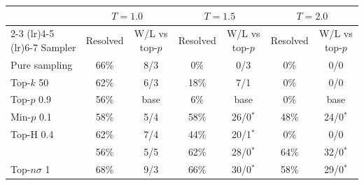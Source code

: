 \begin{tabular}{lcccccc}
\toprule
 & \multicolumn{2}{c}{$T{=}1.0$} & \multicolumn{2}{c}{$T{=}1.5$} & \multicolumn{2}{c}{$T{=}2.0$} \\
\cmidrule(lr){2-3} \cmidrule(lr){4-5} \cmidrule(lr){6-7}
Sampler & Resolved & W/L vs top-$p$ & Resolved & W/L vs top-$p$ & Resolved & W/L vs top-$p$ \\
\midrule
Pure sampling & 66\% & 8/3 & 0\% & 0/3 & 0\% & 0/0 \\
Top-$k$ 50 & 62\% & 6/3 & 18\% & 7/1 & 0\% & 0/0 \\
Top-$p$ 0.9 & 56\% & base & 6\% & base & 0\% & base \\
Min-$p$ 0.1 & 58\% & 5/4 & 58\% & 26/0$^{*}$ & 48\% & 24/0$^{*}$ \\
Top-H 0.4 & 62\% & 7/4 & 44\% & 20/1$^{*}$ & 0\% & 0/0 \\
\pless{} & 56\% & 5/5 & 62\% & 28/0$^{*}$ & 64\% & 32/0$^{*}$ \\
Top-$n\sigma$ 1 & 68\% & 9/3 & 66\% & 30/0$^{*}$ & 58\% & 29/0$^{*}$ \\
\bottomrule
\end{tabular}
